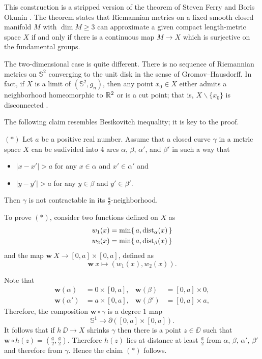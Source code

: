 This construction is a stripped version of the theorem of Steven Ferry and Boris Okunin \cite[see][]{ferry-okun}.
The theorem states that Riemannian metrics on a fixed smooth closed manifold $M$ with $\dim M\ge 3$ 
can approximate a given compact length-metric space $X$ 
if and only if 
there is a continuous map $M\to X$ which is surjective on the fundamental groups. 

The two-dimensional case is quite different.
There is no sequence of Riemannian metrics on
$\mathbb{S}^2$ converging to the unit disk in the sense of Gromov--Hausdorff.
In fact, 
if $X$ is a limit of $(\mathbb{S}^2,g_n)$,
then any point $x_0\in X$ either admits a neighborhood homeomorphic to $\mathbb{R}^2$ or is a cut point;
that is, $X\backslash\{x_0\}$ is disconnected \cite[see 3.32 in][]{gromov-MetStr}.

The following claim resembles Besikovitch inequality;
it is key to the proof.
\begin{cl}{$({*})$} Let $a$ be a positive real number.
 Assume that a closed curve $\gamma$ in a metric space $X$ can be sudivided into 4 arcs $\alpha$, $\beta$, $\alpha'$, and $\beta'$ in such a way that 
 \begin{itemize}
 \item $|x-x'|>a$ for any $x\in\alpha$ and $x'\in \alpha'$
 and
 \item $|y-y'|>a$ for any $y\in\beta$ and $y'\in \beta'$.
 \end{itemize}
 Then $\gamma$ is not contractable in its $\tfrac a2$-neighborhood.
\end{cl}


To prove $({*})$, consider two functions defined on $X$ as
\begin{align*}
w_1(x)&=\min \{\,a,\operatorname{\rm dist}\nolimits_{\alpha}(x)\,\}
\\
w_2(x)&=\min \{\,a,\operatorname{\rm dist}\nolimits_{\beta}(x)\,\}
\end{align*}
and the map $\bm{w}\:X\to [0,a]\times[0,a]$, defined as 
\[\bm{w}\:x\mapsto(w_1(x),w_2(x)).\]

Note that 
\begin{align*}
\bm{w}(\alpha)&=0\times [0,a],
&
\bm{w}(\beta)&=[0,a]\times 0,
\\
\bm{w}(\alpha')&=a\times [0,a],
&
\bm{w}(\beta')&=[0,a]\times a,
\end{align*} 
Therefore, the composition $\bm{w}\circ\gamma$ is a degree 1 map 
\[\mathbb{S}^1\to \partial([0,a]\times[0,a]).\] 
It follows that if $h\:\DD\to X$ shrinks $\gamma$ then there is a point $z\in\DD$ such that 
$\bm{w}\circ h(z)=(\tfrac a2,\tfrac a2)$.
Therefore $h(z)$ lies at distance at least $\tfrac a2$ from $\alpha$, $\beta$, $\alpha'$, $\beta'$
and therefore from $\gamma$.
Hence the claim $({*})$ follows.

